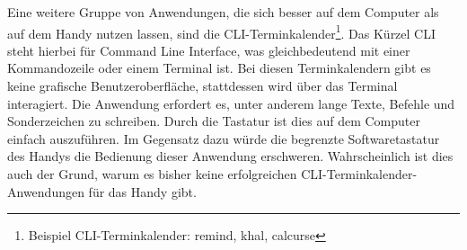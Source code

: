 %
\newline
\myNewSection
Eine weitere Gruppe von Anwendungen, die sich besser auf dem Computer als auf dem Handy nutzen lassen, sind die CLI-Terminkalender\footnote{Beispiel CLI-Terminkalender: remind\cite{cli_remind}, khal\cite{cli_khal}, calcurse\cite{cli_calcurse}}. Das Kürzel \glqq CLI\grqq{} steht hierbei für \glqq Command Line Interface\grqq{}, was gleichbedeutend mit einer Kommandozeile oder einem Terminal ist. Bei diesen Terminkalendern gibt es keine grafische Benutzeroberfläche, stattdessen wird über das Terminal interagiert. Die Anwendung erfordert es, unter anderem lange Texte, Befehle und Sonderzeichen zu schreiben. Durch die Tastatur ist dies auf dem Computer einfach auszuführen. Im Gegensatz dazu würde die begrenzte Softwaretastatur des Handys die Bedienung dieser Anwendung erschweren. Wahrscheinlich ist dies auch der Grund, warum es bisher keine erfolgreichen CLI-Terminkalender-Anwendungen für das Handy gibt.%
%
%
%
